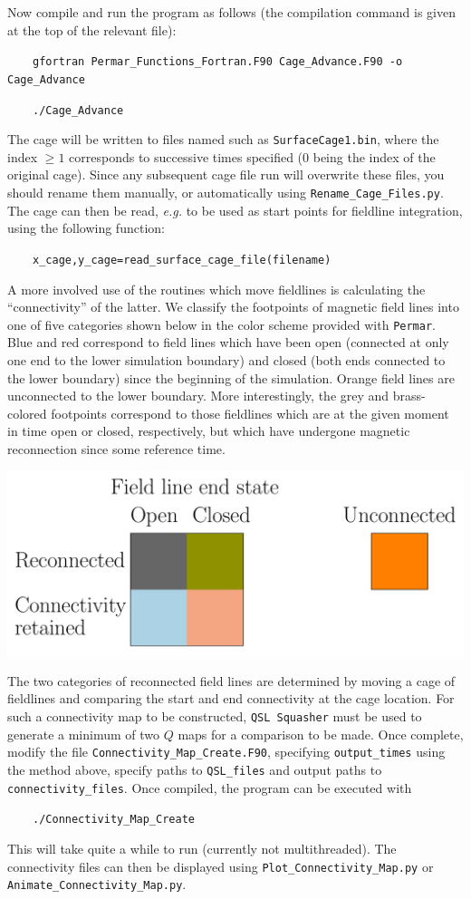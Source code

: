 \documentclass[12pt,twoside]{article}
\begin{document}
Now compile and run the program as follows (the compilation command is given at the top of the relevant file):

$\quad\quad$\texttt{gfortran Permar\_Functions\_Fortran.F90 Cage\_Advance.F90 -o Cage\_Advance}

$\quad\quad$\texttt{./Cage\_Advance}

The cage will be written to files named such as \texttt{SurfaceCage1.bin}, where the index $\geq 1$ corresponds to successive times specified ($0$ being the index of the original cage). Since any subsequent cage file run will overwrite these files, you should rename them manually, or automatically using \texttt{Rename\_Cage\_Files.py}. The cage can then be read, \textit{e.g.} to be used as start points for fieldline integration, using the following function:

$\quad\quad$\texttt{x\_cage,y\_cage=read\_surface\_cage\_file(filename)}

\vspace{2mm}

A more involved use of the routines which move fieldlines is calculating the ``connectivity'' of the latter. We classify the footpoints of magnetic field lines into one of five categories shown below in the color scheme provided with \texttt{Permar}. Blue and red correspond to field lines which have been open (connected at only one end to the lower simulation boundary) and closed (both ends connected to the lower boundary) since the beginning of the simulation. Orange field lines are unconnected to the lower boundary. More interestingly, the grey and brass-colored footpoints correspond to those fieldlines which are at the given moment in time open or closed, respectively, but which have undergone magnetic reconnection since some reference time.  

\includegraphics[scale=0.3]{Connectivity_Legend.pdf}

The two categories of reconnected field lines are determined by moving a cage of fieldlines and comparing the start and end connectivity at the cage location. For such a connectivity map to be constructed, \texttt{QSL Squasher} must be used to generate a minimum of two $Q$ maps for a comparison to be made. Once complete, modify the file \texttt{Connectivity\_Map\_Create.F90}, specifying \texttt{output\_times} using the method above, specify paths to \texttt{QSL\_files} and output paths to \texttt{connectivity\_files}. Once compiled, the program can be executed with

$\quad\quad$\texttt{./Connectivity\_Map\_Create}

This will take quite a while to run (currently not multithreaded). The connectivity files can then be displayed using \texttt{Plot\_Connectivity\_Map.py} or \texttt{Animate\_Connectivity\_Map.py}.
\end{document}
